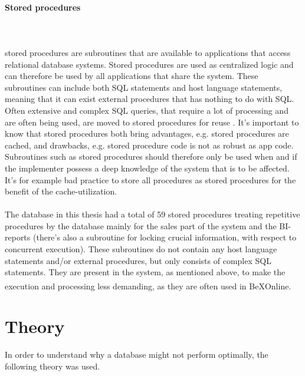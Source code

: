 \documentclass{cslthse-msc}
\newcommand{\bex}{BeX\textsuperscript{\textregistered}}
\begin{document}
\paragraph*{Stored procedures}\mbox{}\\\\ 
stored procedures are subroutines that are available to applications that access relational database systems. Stored procedures are used as centralized logic and can therefore be used by all applications that share the system. These subroutines can include both SQL statements and host language statements, meaning that it can exist external procedures that has nothing to do with SQL. Often extensive and complex SQL queries, that require a lot of processing and are often being used, are moved to stored procedures for reuse   \cite{StoredProcedures}. It's important to know that stored procedures both bring advantages, e.g. stored procedures are cached, and drawbacks, e.g. stored procedure code is not as robust as app code. Subroutines such as stored procedures should therefore only be used when and if the implementer possess a deep knowledge of the system that is to be affected. It's for example bad practice to store all procedures as stored procedures for the benefit of the cache-utilization.\\\\
The database in this thesis had a total of 59 stored procedures treating repetitive procedures by the database mainly for the sales part of the system and the BI-reports (there's also a subroutine for locking crucial information, with respect to concurrent execution). These subroutines do not contain any host language statements and/or external procedures, but only consists of complex SQL statements. They are present in the system, as mentioned above, to make the execution and processing less demanding, as they are often used in \bex Online.

 
\section{Theory}
In order to understand why a database might not perform optimally, the following theory was used.
\end{document}

